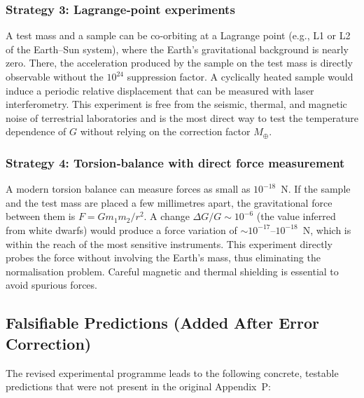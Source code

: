 \documentclass[12pt]{article}
\theoremstyle{remark}
\begin{document}
	\subsubsection*{Strategy 3: Lagrange‑point experiments}
	A test mass and a sample can be co‑orbiting at a Lagrange point (e.g., L1 or L2 of the
	Earth–Sun system), where the Earth's gravitational background is nearly zero.  There, the
	acceleration produced by the sample on the test mass is directly observable without the
	$10^{24}$ suppression factor.  A cyclically heated sample would induce a periodic
	relative displacement that can be measured with laser interferometry.  This experiment is
	free from the seismic, thermal, and magnetic noise of terrestrial laboratories and is the
	most direct way to test the temperature dependence of $G$ without relying on the
	correction factor $M_\oplus$.
	
	\subsubsection*{Strategy 4: Torsion‑balance with direct force measurement}
	A modern torsion balance can measure forces as small as $10^{-18}$~N.  If the sample and
	the test mass are placed a few millimetres apart, the gravitational force between them is
	$F = G m_1 m_2 / r^2$.  A change $\Delta G / G \sim 10^{-6}$ (the value inferred from
	white dwarfs) would produce a force variation of $\sim 10^{-17}$–$10^{-18}$~N, which is
	within the reach of the most sensitive instruments.  This experiment directly probes the
	force without involving the Earth's mass, thus eliminating the normalisation problem.
	Careful magnetic and thermal shielding is essential to avoid spurious forces.
	
	\subsection{Falsifiable Predictions (Added After Error Correction)}
	\label{subsec:new-predictions}
	
	The revised experimental programme leads to the following concrete, testable predictions
	that were not present in the original Appendix~P:
	
\end{document}
